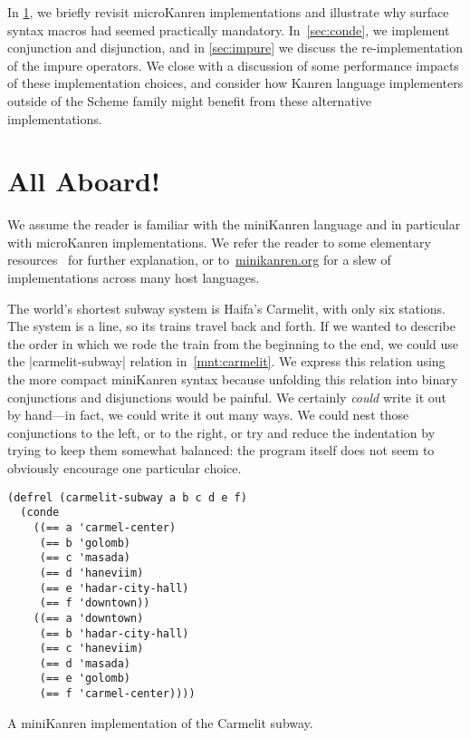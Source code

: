 \documentclass[sigplan,screen,draft,anonymous,review,natbib=false]{acmart}
\begin{document}
In \cref{sec:all-aboard}, we briefly revisit microKanren
implementations and illustrate why surface syntax
macros had seemed practically mandatory. In~\cref{sec:conde}, we implement conjunction and disjunction, and in
\cref{sec:impure} we discuss the re-implementation of the impure
operators. We close with a discussion of some performance impacts of
these implementation choices, and consider how Kanren language
implementers outside of the Scheme family might benefit from these
alternative implementations.

\section{All Aboard!}\label{sec:all-aboard}

We assume the reader is familiar with the miniKanren language and in
particular with microKanren implementations. We refer the reader to
some elementary
resources~\cite{friedman2018reasoned,hemann2013muKanren,hemann2016small}
for further explanation, or to~\href{minikanren.org}{minikanren.org}
for a slew of implementations across many host languages.

The world's shortest subway system is Haifa's Carmelit, with only
six stations. The system is a line, so its trains travel back and
forth. If we wanted to describe the order in which we rode the train
from the beginning to the end, we could use the
\rackinline|carmelit-subway| relation in~\cref{mnt:carmelit}. We
express this relation using the more compact miniKanren syntax because
unfolding this relation into binary conjunctions and disjunctions
would be painful. We certainly \emph{could} write it out by hand---in
fact, we could write it out many ways. We could nest those
conjunctions to the left, or to the right, or try and reduce the
indentation by trying to keep them somewhat balanced: the program
itself does not seem to obviously encourage one particular choice.

\begin{listing}
  \begin{verbatim}
(defrel (carmelit-subway a b c d e f)
  (conde
    ((== a 'carmel-center)
     (== b 'golomb)
     (== c 'masada)
     (== d 'haneviim)
     (== e 'hadar-city-hall)
     (== f 'downtown))
    ((== a 'downtown)
     (== b 'hadar-city-hall)
     (== c 'haneviim)
     (== d 'masada)
     (== e 'golomb)
     (== f 'carmel-center))))
  \end{verbatim}
  \caption{A miniKanren implementation of the Carmelit subway.}
  \label{mnt:carmelit}
\end{listing}
\end{document}
